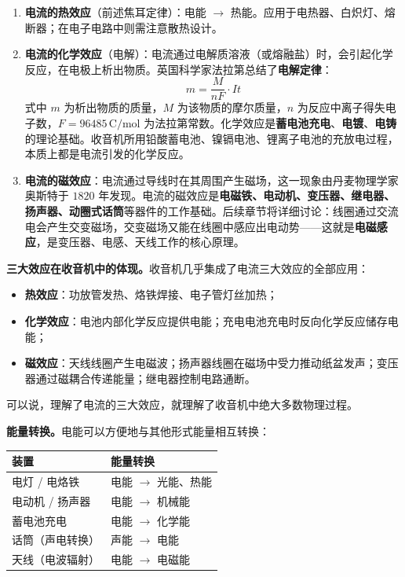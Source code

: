 \documentclass[12pt,UTF8]{ctexbook}
\begin{document}
\begin{enumerate}
  \item \textbf{电流的热效应}（前述焦耳定律）：电能 $\to$ 热能。应用于电热器、白炽灯、熔断器；在电子电路中则需注意散热设计。

  \item \textbf{电流的化学效应}（电解）：电流通过电解质溶液（或熔融盐）时，会引起化学反应，在电极上析出物质。英国科学家法拉第总结了\textbf{电解定律}：
  \[
  m = \frac{M}{n F} \cdot I t
  \]
  式中 $m$ 为析出物质的质量，$M$ 为该物质的摩尔质量，$n$ 为反应中离子得失电子数，$F = 96485\,\mathrm{C/mol}$ 为法拉第常数。化学效应是\textbf{蓄电池充电}、\textbf{电镀}、\textbf{电铸}的理论基础。收音机所用铅酸蓄电池、镍镉电池、锂离子电池的充放电过程，本质上都是电流引发的化学反应。

  \item \textbf{电流的磁效应}：电流通过导线时在其周围产生磁场，这一现象由丹麦物理学家奥斯特于 $1820$ 年发现。电流的磁效应是\textbf{电磁铁、电动机、变压器、继电器、扬声器、动圈式话筒}等器件的工作基础。后续章节将详细讨论：线圈通过交流电会产生交变磁场，交变磁场又能在线圈中感应出电动势——这就是\textbf{电磁感应}，是变压器、电感、天线工作的核心原理。
\end{enumerate}


\textbf{三大效应在收音机中的体现。}收音机几乎集成了电流三大效应的全部应用：
\begin{itemize}
  \item \textbf{热效应}：功放管发热、烙铁焊接、电子管灯丝加热；
  \item \textbf{化学效应}：电池内部化学反应提供电能；充电电池充电时反向化学反应储存电能；
  \item \textbf{磁效应}：天线线圈产生电磁波；扬声器线圈在磁场中受力推动纸盆发声；变压器通过磁耦合传递能量；继电器控制电路通断。
\end{itemize}
可以说，理解了电流的三大效应，就理解了收音机中绝大多数物理过程。

\textbf{能量转换。}电能可以方便地与其他形式能量相互转换：
\begin{center}
\begin{tabular}{ll}
\hline
\textbf{装置} & \textbf{能量转换} \\
\hline
电灯 / 电烙铁 & 电能 $\rightarrow$ 光能、热能 \\
电动机 / 扬声器 & 电能 $\rightarrow$ 机械能 \\
蓄电池充电 & 电能 $\rightarrow$ 化学能 \\
话筒（声电转换） & 声能 $\rightarrow$ 电能 \\
天线（电波辐射） & 电能 $\rightarrow$ 电磁能 \\
\hline
\end{tabular}
\end{center}
\end{document}

